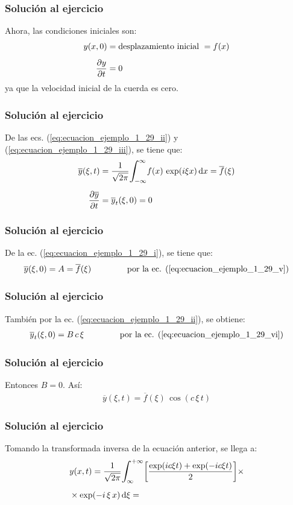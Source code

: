 \begin{frame}
\frametitle{Solución al ejercicio}
Ahora, las condiciones iniciales son:
\pause
\begin{align}
y (x, 0) &= \mbox{desplazamiento inicial } = f (x) \label{eq:ecuacion_ejemplo_1_29_iii} \\[0.5em]
\pdv{y}{t} (x, 0) &= 0 \label{eq:ecuacion_ejemplo_1_29_iv}
\end{align}
ya que la velocidad inicial de la cuerda es cero.
\end{frame}
\begin{frame}
\frametitle{Solución al ejercicio}
De las ecs. (\ref{eq:ecuacion_ejemplo_1_29_ii}) y (\ref{eq:ecuacion_ejemplo_1_29_iii}), se tiene que:
\pause
\begin{align}
\overline{y} (\xi, t) &= \dfrac{1}{\sqrt{2 \pi}} \scaleint{6ex}_{\bs -\infty}^{\infty} f (x) \, \exp(i \xi x) \dd{x} = \overline{f} (\xi) \label{eq:ecuacion_ejemplo_1_29_v} \\[0.5em]
\pdv{\overline{y}}{t} (\xi, 0) &= \overline{y}_{t} (\xi, 0) = 0 \label{eq:ecuacion_ejemplo_1_29_vi}
\end{align}
\end{frame}
\begin{frame}
\frametitle{Solución al ejercicio}
De la ec. (\ref{eq:ecuacion_ejemplo_1_29_i}), se tiene que:
\pause
\begin{align}
\overline{y} (\xi, 0) = A = \overline{f} (\xi) \hspace{1.5cm} \mbox{por la ec. (\ref{eq:ecuacion_ejemplo_1_29_v})}
\end{align}
\end{frame}
\begin{frame}
\frametitle{Solución al ejercicio}
También por la ec. (\ref{eq:ecuacion_ejemplo_1_29_ii}), se obtiene:
\pause
\begin{align}
\overline{y}_{t} (\xi, 0) = B \, c \, \xi \hspace{1.5cm} \mbox{por la ec. (\ref{eq:ecuacion_ejemplo_1_29_vi})}
\end{align}
\end{frame}
\begin{frame}
\frametitle{Solución al ejercicio}
Entonces  $B = 0$. Así:
\pause
\begin{align*}
\overline{y}(\xi, t) = \overline{f}(\xi) \, \cos (c \, \xi \, t)
\end{align*}
\end{frame}
\begin{frame}
\frametitle{Solución al ejercicio}
Tomando la transformada inversa de la ecuación anterior, se llega a:
\pause
\begin{eqnarray*}
\begin{aligned}
&y (x, t) = \dfrac{1}{\sqrt{2 \pi}} \scaleint{6ex}_{\bs \infty}^{+ \infty} \bigg[ \dfrac{\exp(i c \xi t) + \exp(-i c \xi t)}{2} \bigg] \times \\[0.5em]
&\times  \exp(-i \, \xi \, x) \dd{\xi} = 
\end{aligned}
\end{eqnarray*}
\end{frame}
